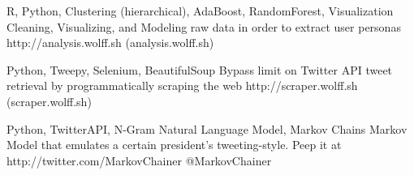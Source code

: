 \documentclass[10pt, letterpaper]{awesome-cv}
\begin{document}
\vspace*{-1ex}
\begin{projects}
    {R, Python, Clustering (hierarchical), AdaBoost, RandomForest, Visualization}
    {Cleaning, Visualizing, and Modeling raw data in order to extract user personas}
    {http://analysis.wolff.sh}
    {(analysis.wolff.sh)}   
        
    {Python, Tweepy, Selenium, BeautifulSoup}
    {Bypass limit on Twitter API tweet retrieval by programmatically scraping the web}
    {http://scraper.wolff.sh}
    {(scraper.wolff.sh)}
    
    
    {Python, TwitterAPI, N-Gram Natural Language Model, Markov Chains}
    {Markov Model that emulates a certain president's tweeting-style. Peep it at}
    {http://twitter.com/MarkovChainer}
    {@MarkovChainer}
    
    
    
\end{projects}
\end{document}
